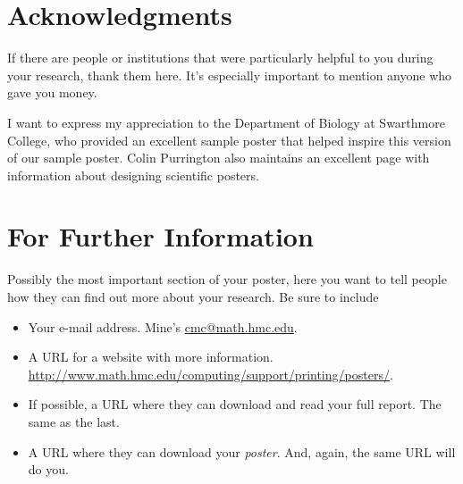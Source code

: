 \documentclass{hmcclinicposter}
\begin{document}
\begin{poster}





\section{Acknowledgments}

If there are people or institutions that were particularly helpful
to you during your research, thank them here.  It's especially
important to mention anyone who gave you money.

I want to express my appreciation to the Department of Biology at
Swarthmore College, who provided an excellent sample poster
\citep{swarthmore-poster} that helped inspire this version of our
sample poster.  Colin Purrington also maintains an excellent page
with information about designing scientific
posters. \citeyearpar{purrington-sciposters}


\section{For Further Information}

Possibly the most important section of your poster, here you want to
tell people how they can find out more about your research.  Be sure
to include
\begin{itemize}
\item Your e-mail address.  Mine's \url{cmc@math.hmc.edu}.
\item A URL for a website with more information.  \url{http://www.math.hmc.edu/computing/support/printing/posters/}.
\item If possible, a URL where they can download and read your full
  report.  The same as the last.
\item A URL where they can download your \emph{poster}.  And, again,
  the same URL will do you.
\end{itemize}



\end{poster}
\end{document}
